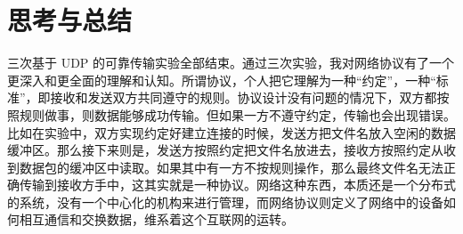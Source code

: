 \documentclass[UTF8,a4paper,10pt]{ctexart}
\begin{document}
\section{思考与总结}
三次基于 UDP 的可靠传输实验全部结束。通过三次实验，我对网络协议有了一个更深入和更全面的理解和认知。所谓协议，个人把它理解为一种“约定”，一种“标准”，即接收和发送双方共同遵守的规则。协议设计没有问题的情况下，双方都按照规则做事，则数据能够成功传输。但如果一方不遵守约定，传输也会出现错误。比如在实验中，双方实现约定好建立连接的时候，发送方把文件名放入空闲的数据缓冲区。那么接下来则是，发送方按照约定把文件名放进去，接收方按照约定从收到数据包的缓冲区中读取。如果其中有一方不按规则操作，那么最终文件名无法正确传输到接收方手中，这其实就是一种协议。网络这种东西，本质还是一个分布式的系统，没有一个中心化的机构来进行管理，而网络协议则定义了网络中的设备如何相互通信和交换数据，维系着这个互联网的运转。
\end{document}
